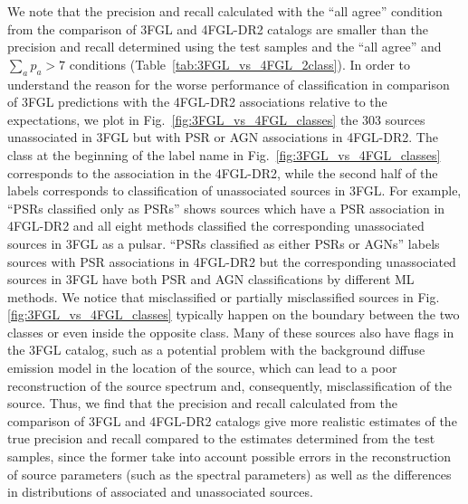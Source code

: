 We note that the precision and recall calculated with the ``all agree'' condition from the comparison of 3FGL and 4FGL-DR2 catalogs are smaller than the precision and recall determined using the test samples and the ``all agree'' and $\sum_a p_a > 7$ conditions (Table~\ref{tab:3FGL_vs_4FGL_2class}).
In order to understand the reason for the worse performance of classification in comparison of 3FGL predictions with the 4FGL-DR2 associations relative to the expectations, we plot in Fig.~\ref{fig:3FGL_vs_4FGL_classes} the 303 sources unassociated in 3FGL but with PSR or AGN associations in 4FGL-DR2.
The class at the beginning of the label name in Fig.~\ref{fig:3FGL_vs_4FGL_classes} corresponds to the association in the 4FGL-DR2, while the second half of the labels corresponds to classification of unassociated sources in 3FGL. For example, ``PSRs classified only as PSRs'' shows sources which have a PSR association in 4FGL-DR2 and all eight methods classified the corresponding unassociated sources in 3FGL as a pulsar. ``PSRs classified as either PSRs or AGNs'' labels sources with PSR associations in 4FGL-DR2 but the corresponding unassociated sources in 3FGL have both PSR and AGN classifications by different ML methods.
We notice that misclassified or partially misclassified sources in Fig. \ref{fig:3FGL_vs_4FGL_classes} typically happen on the boundary between the two classes or even inside the opposite class.
Many of these sources also have flags in the 3FGL catalog, such as a potential problem with the background diffuse emission model in the location of the source, which can lead to a poor reconstruction of the source spectrum and, consequently, misclassification of the source.
Thus, we find that the precision and recall calculated from the comparison of 3FGL and 4FGL-DR2 catalogs give more realistic estimates
of the true precision and recall compared to the estimates determined from the test samples, since the former
take into account possible errors in the reconstruction of source parameters (such as the spectral parameters) as well as the differences in distributions of associated and unassociated sources.

%


